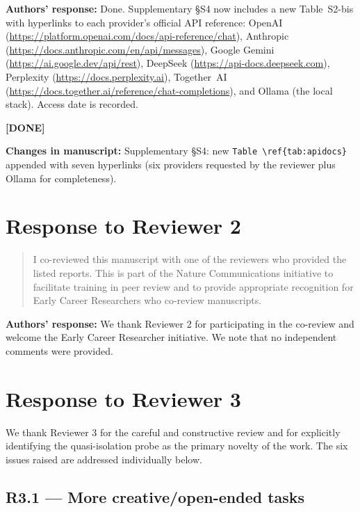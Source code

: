 \documentclass[11pt,a4paper]{article}
\newenvironment{revquote}{%
  \begin{quote}\small\itshape\color{revgray}
}{%
  \end{quote}
}
\newcommand{\response}[1]{\par\noindent\textbf{\color{revgreen}Authors' response:} #1\par}
\newcommand{\changes}[1]{\par\noindent\textbf{\color{revblue}Changes in manuscript:} #1\par}
\newcommand{\done}{\color{revgreen}\textbf{[DONE]}}
\begin{document}
\response{Done. Supplementary §S4 now includes a new Table~S2-bis with hyperlinks to each provider's official API reference: OpenAI (\url{https://platform.openai.com/docs/api-reference/chat}), Anthropic (\url{https://docs.anthropic.com/en/api/messages}), Google Gemini (\url{https://ai.google.dev/api/rest}), DeepSeek (\url{https://api-docs.deepseek.com}), Perplexity (\url{https://docs.perplexity.ai}), Together~AI (\url{https://docs.together.ai/reference/chat-completions}), and Ollama (the local stack). Access date is recorded.} \done

\changes{Supplementary §S4: new \texttt{Table~\textbackslash ref\{tab:apidocs\}} appended with seven hyperlinks (six providers requested by the reviewer plus Ollama for completeness).}

\newpage
\section*{Response to Reviewer 2}

\begin{revquote}
I co-reviewed this manuscript with one of the reviewers who provided the listed reports. This is part of the Nature Communications initiative to facilitate training in peer review and to provide appropriate recognition for Early Career Researchers who co-review manuscripts.
\end{revquote}

\response{We thank Reviewer 2 for participating in the co-review and welcome the Early Career Researcher initiative. We note that no independent comments were provided.}

\newpage
\section*{Response to Reviewer 3}

We thank Reviewer 3 for the careful and constructive review and for explicitly identifying the quasi-isolation probe as the primary novelty of the work. The six issues raised are addressed individually below.

\subsection*{R3.1 --- More creative/open-ended tasks}
\end{document}

